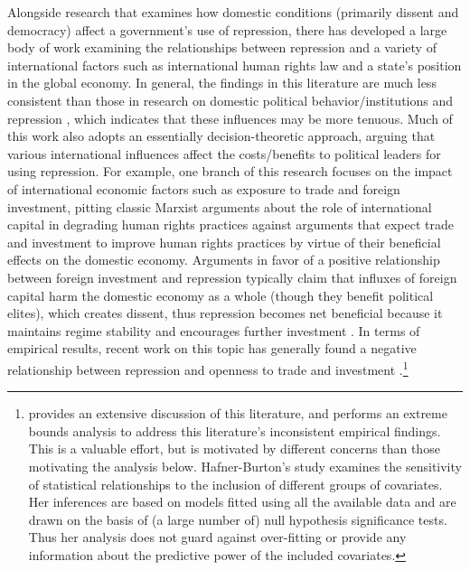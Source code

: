 \documentclass[11pt]{article}
\begin{document}
Alongside research that examines how domestic conditions (primarily dissent and democracy) affect a government's use of repression, there has developed a large body of work examining the relationships between repression and a variety of international factors such as international human rights law and a state's position in the global economy. In general, the findings in this literature are much less consistent than those in research on domestic political behavior/institutions and repression \citep{HafnerBurton2005jpr,Davenport2007AR}, which indicates that these influences may be more tenuous. Much of this work also adopts an essentially decision-theoretic approach, arguing that various international influences affect the costs/benefits to political leaders for using repression. For example, one branch of this research focuses on the impact of international economic factors such as exposure to trade and foreign investment, pitting classic Marxist arguments about the role of international capital in degrading human rights practices against arguments that expect trade and investment to improve human rights practices by virtue of their beneficial effects on the domestic economy. Arguments in favor of a positive relationship between foreign investment and repression typically claim that influxes of foreign capital harm the domestic economy as a whole (though they benefit political elites), which creates dissent, thus repression becomes net beneficial because it maintains regime stability and encourages further investment \citep[See, e.g.][]{Meyer1996}. In terms of empirical results, recent work on this topic has generally found a negative relationship between repression and openness to trade and investment \citep{Apodaca2001, RichardsGellenySacko2001, HafnerBurton2005jpr}.\footnote{\citet{HafnerBurton2005jpr} provides an extensive discussion of this literature, and performs an extreme bounds analysis \citep{LeamerLeonard1983} to address this literature's inconsistent empirical findings. This is a valuable effort, but is motivated by different concerns than those motivating the analysis below. Hafner-Burton's study examines the sensitivity of statistical relationships to the inclusion of different groups of covariates. Her inferences are based on models fitted using all the available data and are drawn on the basis of (a large number of) null hypothesis significance tests. Thus her analysis does not guard against over-fitting or provide any information about the predictive power of the included covariates.}  
\end{document}
